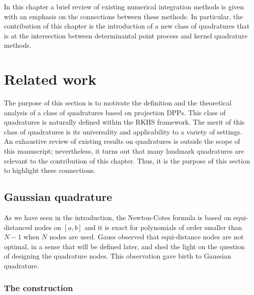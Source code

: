 \documentclass[twoside,11pt]{book}
\numberwithin{theorem}{chapter}
\numberwithin{definition}{chapter}
\numberwithin{proposition}{chapter}
\numberwithin{corollary}{chapter}
\numberwithin{example}{chapter}
\numberwithin{lemma}{chapter}
\begin{document}
In this chapter a brief review of existing numerical integration methods is given with an emphasis on the connections between these methods. In particular, the contribution of this chapter is the introduction of a new class of quadratures that is at the intersection between determinantal point process and kernel quadrature methods.



\section{Related work}
The purpose of this section is to motivate the definition and the theoretical analysis of a class of quadratures based on projection DPPs. This class of quadratures is naturally defined within the RKHS framework. The merit of this class of quadratures is its universality and applicability to a variety of settings. An exhaustive review of existing results on quadratures is outside the scope of this manuscript; nevertheless, it turns out that many landmark quadratures are relevant to the contribution of this chapter. 
Thus, it is the purpose of this section to highlight these connections.







\subsection{Gaussian quadrature}
As we have seen in the introduction, the Newton-Cotes formula is based on equi-distanced nodes on $[a,b]$ and it is exact for polynomials of order smaller than $N-1$ when $N$ nodes are used. Gauss \citep{Gau1815} observed that equi-distance nodes are not optimal, in a sense that will be defined later, and shed the light on the question of designing the quadrature nodes. This observation gave birth to Gaussian quadrature.

\subsubsection{The construction}
\end{document}
